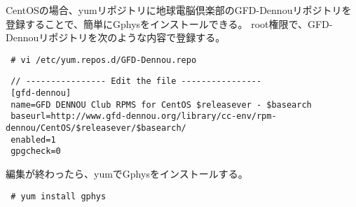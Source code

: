 CentOSの場合、yumリポジトリに地球電脳倶楽部のGFD-Dennouリポジトリを登録することで、簡単にGphysをインストールできる。
root権限で、GFD-Dennouリポジトリを次のような内容で登録する。

\begin{verbatim}
 # vi /etc/yum.repos.d/GFD-Dennou.repo
\end{verbatim}

\begin{verbatim}
 // ---------------- Edit the file ----------------
 [gfd-dennou]
 name=GFD DENNOU Club RPMS for CentOS $releasever - $basearch
 baseurl=http://www.gfd-dennou.org/library/cc-env/rpm-dennou/CentOS/$releasever/$basearch/
 enabled=1
 gpgcheck=0
\end{verbatim}

編集が終わったら、yumでGphysをインストールする。

\begin{verbatim}
 # yum install gphys
\end{verbatim}
